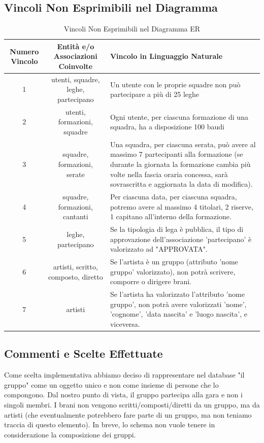 \documentclass[a4paper,12pt]{article}
\begin{document}
\subsection{Vincoli Non Esprimibili nel Diagramma}
	\begin{table}[h!]
	    \centering
	    \begin{tabular}{|c|c|p{6.5cm}|}
	        \hline
	        \textbf{Numero Vincolo} & \textbf{Entità e/o Associazioni Coinvolte} & \textbf{Vincolo in Linguaggio Naturale} \\ \hline
	        1 & utenti, squadre, leghe, partecipano & Un utente con le proprie squadre non può partecipare a più di 25 leghe \\ \hline
	        2 & utenti, formazioni, squadre & Ogni utente, per ciascuna formazione di una squadra, ha a disposizione 100 baudi \\ \hline
	       	3 & squadre, formazioni, serate & Una squadra, per ciascuna serata, può avere al massimo 7 partecipanti alla formazione (se durante la giornata la formazione cambia più volte nella fascia oraria concessa, sarà sovrascritta e aggiornata la data di modifica). \\ \hline
	        4 & squadre, formazioni, cantanti & Per ciascuna data, per ciascuna squadra, potremo avere al massimo 4 titolari, 2 riserve, 1 capitano all'interno della formazione. \\ \hline
	        5 & leghe, partecipano & Se la tipologia di lega è pubblica, il tipo di approvazione dell'associazione 'partecipano' è valorizzato ad "APPROVATA". \\ \hline
	        6 & artisti, scritto, composto, diretto & Se l'artista è un gruppo (attributo 'nome gruppo' valorizzato), non potrà scrivere, comporre o dirigere brani. \\ \hline
	        7 & artisti & Se l'artista ha valorizzato l'attributo 'nome gruppo', non potrà avere valorizzati 'nome', 'cognome', 'data nascita' e 'luogo nascita', e viceversa.  \\ \hline
	    \end{tabular}
	    \caption{Vincoli Non Esprimibili nel Diagramma ER}
	\end{table}
\subsection{Commenti e Scelte Effettuate}
\noindent
Come scelta implementativa abbiamo deciso di rappresentare nel database "il gruppo" come un oggetto unico e non come insieme di persone che lo compongono. Dal nostro punto di vista, il gruppo partecipa alla gara e non i singoli membri. I brani non vengono scritti/composti/diretti da un gruppo, ma da artisti (che eventualmente potrebbero fare parte di un gruppo, ma non teniamo traccia di questo elemento). In breve, lo schema non vuole tenere in considerazione la composizione dei gruppi.
\end{document}
